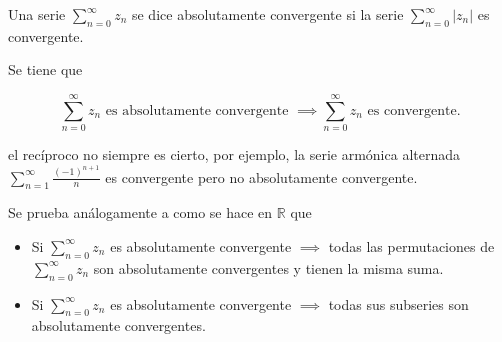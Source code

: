 \begin{definición} 
    Una serie $\sum_{n=0}^{\infty} z_n$ se dice absolutamente convergente si la serie $\sum_{n=0}^{\infty} |z_n|$ es convergente.
\end{definición}

Se tiene que 

\[
    \sum_{n=0}^{\infty} z_n \text{ es absolutamente convergente } \implies \sum_{n=0}^{\infty} z_n \text{ es convergente.}
\]

el recíproco no siempre es cierto, por ejemplo, la serie armónica alternada $\sum_{n=1}^{\infty} \frac{(-1)^{n+1}}{n}$ es convergente pero no absolutamente convergente.

Se prueba análogamente a como se hace en $\mathbb{R}$ que

\begin{itemize}
    \item Si $\sum_{n=0}^{\infty} z_n$ es absolutamente convergente $\implies$ todas las permutaciones de $\sum_{n=0}^{\infty} z_n$ son absolutamente convergentes y tienen la misma suma.
    \item Si $\sum_{n=0}^{\infty} z_n$ es absolutamente convergente $\implies$ todas sus subseries son absolutamente convergentes.
\end{itemize}


